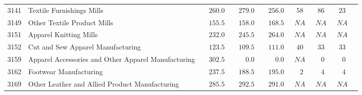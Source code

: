 \documentclass[9pt, oneside]{article}   	%
\begin{document}
\begin{longtable}{lp{3.5 in}ccccccc}
3141  & Textile Furnishings Mills & $\phantom{00}260.0$ & $\phantom{00}279.0$ & $\phantom{00}256.0$ & $\phantom{0}58$ & $\phantom{0}86$ & $\phantom{0}23$ \\
3149  & Other Textile Product Mills & $\phantom{00}155.5$ & $\phantom{00}158.0$ & $\phantom{00}168.5$ & $\phantom{0}NA$ & $\phantom{0}NA$ & $\phantom{0}NA$ \\
3151  & Apparel Knitting Mills & $\phantom{00}232.0$ & $\phantom{00}245.5$ & $\phantom{00}264.0$ & $\phantom{0}NA$ & $\phantom{0}NA$ & $\phantom{0}NA$ \\
3152  & Cut and Sew Apparel Manufacturing & $\phantom{00}123.5$ & $\phantom{00}109.5$ & $\phantom{00}111.0$ & $\phantom{0}40$ & $\phantom{0}33$ & $\phantom{0}33$ \\
3159  & Apparel Accessories and Other Apparel Manufacturing & $\phantom{00}302.5$ & $\phantom{0000}0.0$ & $\phantom{0000}0.0$ & $\phantom{0}NA$ & $\phantom{00}0$ & $\phantom{00}0$ \\
3162  & Footwear Manufacturing & $\phantom{00}237.5$ & $\phantom{00}188.5$ & $\phantom{00}195.0$ & $\phantom{00}2$ & $\phantom{00}4$ & $\phantom{00}4$ \\
3169  & Other Leather and Allied Product Manufacturing & $\phantom{00}285.5$ & $\phantom{00}292.5$ & $\phantom{00}291.0$ & $\phantom{0}NA$ & $\phantom{0}NA$ & $\phantom{0}NA$ \\


\end{longtable}
\end{document}
